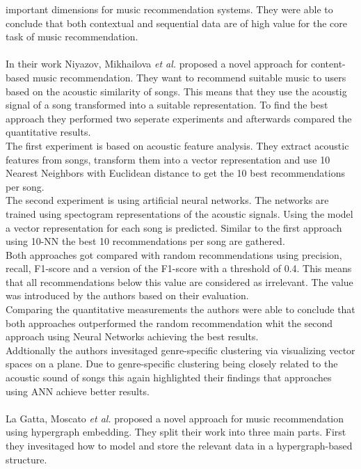 \documentclass[runningheads,a4paper]{llncs}
\begin{document}
 important dimensions for music recommendation systems.
They were able to conclude that both contextual and sequential data are of high value for the core task of music recommendation. 
\cite{hansen2020contextual}\\
\\
In their work Niyazov, Mikhailova \textit{et al.} proposed a novel approach for content-based music recommendation. 
They want to recommend suitable music to users based on the acoustic similarity of songs.
This means that they use the acoustig signal of a song transformed into a suitable representation. 
To find the best approach they performed two seperate experiments and afterwards compared the quantitative results.\\
The first experiment is based on acoustic feature analysis. 
They extract acoustic features from songs, transform them into a vector representation and use 10 Nearest Neighbors with Euclidean distance 
to get the 10 best recommendations per song. \\
The second experiment is using artificial neural networks. 
The networks are trained using spectogram representations of the acoustic signals.
Using the model a vector representation for each song is predicted. 
Similar to the first approach using 10-NN the best 10 recommendations per song are gathered. \\
Both approaches got compared with random recommendations using precision, recall, F1-score and a version of the F1-score with a threshold of 0.4.
This means that all recommendations below this value are considered as irrelevant. The value was introduced by the authors based on their evaluation.\\
Comparing the quantitative measurements the authors were able to conclude that both approaches outperformed the random recommendation
whit the second approach using Neural Networks achieving the best results. \\
Addtionally the authors invesitaged genre-specific clustering via visualizing vector spaces on a plane. 
Due to genre-specific clustering being closely related to the acoustic sound of songs this again highlighted their findings that approaches 
using ANN achieve better results. \cite{niyazov2021content}\\
\\
La Gatta, Moscato \textit{et al.} proposed a novel approach for music recommendation using hypergraph embedding.
They split their work into three main parts.
First they invesitaged how to model and store the relevant data in a hypergraph-based structure.
\end{document}
